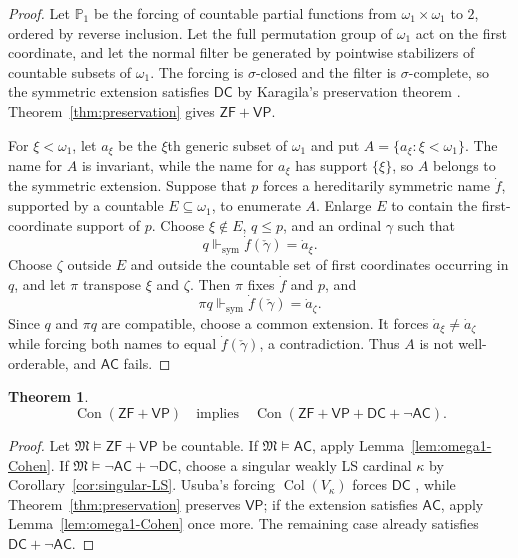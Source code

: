 \documentclass[11pt,a4paper]{amsart}
\newcommand{\VP}{\mathsf{VP}}
\newcommand{\AC}{\mathsf{AC}}
\newcommand{\ZF}{\mathsf{ZF}}
\newcommand{\Con}{\operatorname{Con}}
\newcommand{\forcesS}{\Vdash_{\mathrm{sym}}}
\newcommand{\Col}{\operatorname{Col}}
\newcommand{\DC}{\mathsf{DC}}
\theoremstyle{plain}
\newtheorem{theorem}{Theorem}[section]
\theoremstyle{definition}
\theoremstyle{remark}
\begin{document}
\begin{proof}
Let $\mathbb P_1$ be the forcing of countable partial functions from $\omega_1\times\omega_1$ to $2$, ordered by reverse inclusion.  Let the full permutation group of $\omega_1$ act on the first coordinate, and let the normal filter be generated by pointwise stabilizers of countable subsets of $\omega_1$.  The forcing is $\sigma$-closed and the filter is $\sigma$-complete, so the symmetric extension satisfies $\DC$ by Karagila's preservation theorem \cite[Lemma~3.1]{KaragilaDC}.  Theorem~\ref{thm:preservation} gives $\ZF+\VP$.

For $\xi<\omega_1$, let $a_\xi$ be the $\xi$th generic subset of $\omega_1$ and put $A=\{a_\xi:\xi<\omega_1\}$.  The name for $A$ is invariant, while the name for $a_\xi$ has support $\{\xi\}$, so $A$ belongs to the symmetric extension.  Suppose that $p$ forces a hereditarily symmetric name $\dot f$, supported by a countable $E\subseteq\omega_1$, to enumerate $A$.  Enlarge $E$ to contain the first-coordinate support of $p$.  Choose $\xi\notin E$, $q\leq p$, and an ordinal $\gamma$ such that
\[
q\forcesS\dot f(\check\gamma)=\dot a_\xi.
\]
Choose $\zeta$ outside $E$ and outside the countable set of first coordinates occurring in $q$, and let $\pi$ transpose $\xi$ and $\zeta$.  Then $\pi$ fixes $\dot f$ and $p$, and
\[
\pi q\forcesS\dot f(\check\gamma)=\dot a_\zeta.
\]
Since $q$ and $\pi q$ are compatible, choose a common extension.  It forces $\dot a_\xi\neq\dot a_\zeta$ while forcing both names to equal $\dot f(\check\gamma)$, a contradiction.  Thus $A$ is not well-orderable, and $\AC$ fails.
\end{proof}

\begin{theorem}\label{thm:DC-notAC}
\[
\Con(\ZF+\VP)\quad\text{implies}\quad
\Con(\ZF+\VP+\DC+\neg\AC).
\]
\end{theorem}

\begin{proof}

Let $\mathfrak M\models\ZF+\VP$ be countable.  If $\mathfrak M\models\AC$, apply Lemma~\ref{lem:omega1-Cohen}.  If $\mathfrak M\models\neg\AC+\neg\DC$, choose a singular weakly LS cardinal $\kappa$ by Corollary~\ref{cor:singular-LS}.  Usuba's forcing $\Col(V_\kappa)$ forces $\DC$ \cite[Proposition~3.6]{Usuba}, while Theorem~\ref{thm:preservation} preserves $\VP$; if the extension satisfies $\AC$, apply Lemma~\ref{lem:omega1-Cohen} once more.  The remaining case already satisfies $\DC+\neg\AC$.
\end{proof}
\end{document}
